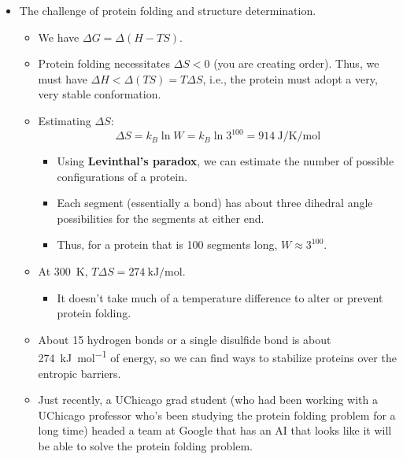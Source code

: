 \documentclass[../notes.tex]{subfiles}
\begin{document}
\begin{itemize}
\begin{itemize}
        \item To achieve temperatures lower than \SI{4}{\kelvin}, you stick copper salt in a cryostat, subject it to a magnetic field, and cool it to \SI{4}{\kelvin} with the above method. The magnet aligns the spins. When you take the salt out of the magnetic field, the spins will randomize entropically, but this takes energy. You use the lattice energy to raise the spin energy.
    \end{itemize}
    \item The challenge of protein folding and structure determination.
    \begin{itemize}
        \item We have $\Delta G=\Delta(H-TS)$.
        \item Protein folding necessitates $\Delta S<0$ (you are creating order). Thus, we must have $\Delta H<\Delta(TS)=T\Delta S$, i.e., the protein must adopt a very, very stable conformation.
        \item Estimating $\Delta S$:
        \begin{equation*}
            \Delta S = k_B\ln W
            = k_B\ln 3^{100}
            = \SI{914}{\joule\per\kelvin\per\mole}
        \end{equation*}
        \begin{itemize}
            \item Using \textbf{Levinthal's paradox}, we can estimate the number of possible configurations of a protein.
            \item Each segment (essentially a  bond) has about three dihedral angle possibilities for the segments at either end.
            \item Thus, for a protein that is 100 segments long, $W\approx 3^{100}$.
        \end{itemize}
        \item At \SI{300}{\kelvin}, $T\Delta S=\SI[per-mode=symbol]{274}{\kilo\joule\per\mole}$.
        \begin{itemize}
            \item It doesn't take much of a temperature difference to alter or prevent protein folding.
        \end{itemize}
        \item About 15 hydrogen bonds or a single disulfide bond is about \SI[per-mode=symbol]{274}{\kilo\joule\per\mole} of energy, so we can find ways to stabilize proteins over the entropic barriers.
        \item Just recently, a UChicago grad student (who had been working with a UChicago professor who's been studying the protein folding problem for a long time) headed a team at Google that has an AI that looks like it will be able to solve the protein folding problem.

\end{itemize}
\end{itemize}
\end{document}
